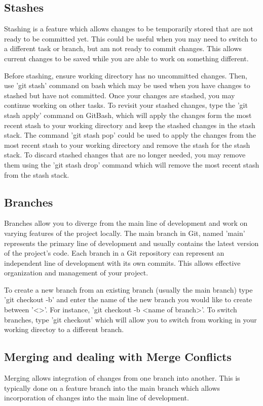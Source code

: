 \documentclass[10pt,twocolumn]{article}
\begin{document}
\subsection {Stashes}
Stashing is a feature which allows changes to be temporarily stored that are not ready to be committed yet. This could be useful when you may need to switch to a different task or branch, but am not ready to commit changes. This allows current changes to be saved while you are able to work on something different. 

Before stashing, ensure working directory has no uncommitted changes. Then, use 'git stash' command on bash which may be used when you have changes to stashed but have not committed. Once your changes are stashed, you may continue working on other tasks. To revisit your stashed changes, type the 'git stash apply' command on GitBash, which will apply the changes form the most recent stash to your working directory and keep the stashed changes in the stash stack. The command 'git stash pop' could be used to apply the changes from the most recent stash to your working directory and remove the stash for the stash stack. To discard stashed changes that are no longer needed, you may remove them using the 'git stash drop' command which will remove the most recent stash from the stash stack. 

\subsection {Branches}
Branches allow you to diverge from the main line of development and work on varying features of the project locally. The main branch in Git, named 'main' represents the primary line of development and usually contains the latest version of the project's code.  Each branch in a Git repository can represent an independent line of development with its own commits. This allows effective organization and management of your project.

To create a new branch from an existing branch (usually the main branch) type 'git checkout -b' and enter the name of the new branch you would like to create between '<>'. For instance, 'git checkout -b <name of branch>'. To switch branches, type 'git checkout' which will allow you to switch from working in your working directoy to a different branch.

\subsection {Merging and dealing with Merge Conflicts}
Merging allows integration of changes from one branch into another. This is typically done on a feature branch into the main branch which allows incorporation of changes into the main line of development. 
\end{document}
